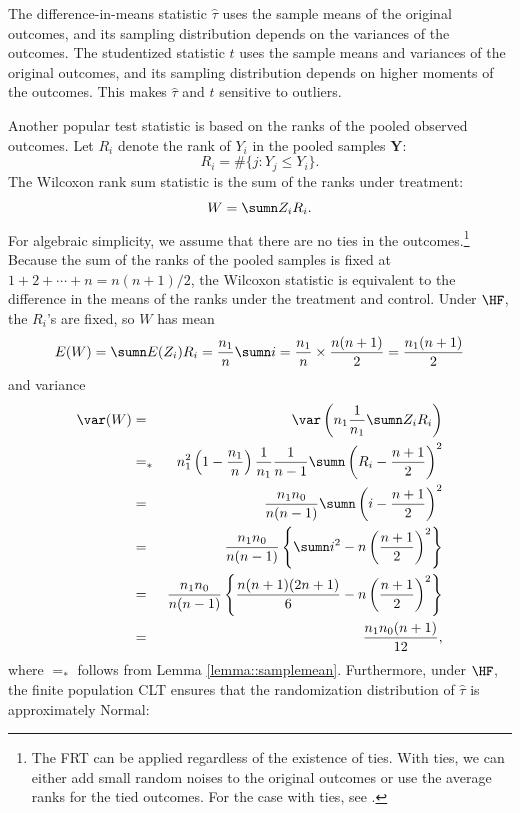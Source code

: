 \begin{example}\label{example::wilcoxon-cre}
The difference-in-means statistic $ \hat{\tau} $ uses the sample means of the original outcomes, and its sampling distribution depends on the variances of the outcomes. The studentized statistic $t$ uses the sample means and variances of the original outcomes, and its sampling distribution depends on higher moments of the outcomes. 
This makes $ \hat{\tau} $ and $t$ sensitive to outliers. 

Another popular test statistic is based on the ranks of the pooled observed outcomes. Let $R_i$ denote the rank of $Y_i$ in the pooled samples $\bm{Y}$: 
$$
R_i = \#\{j : Y_j \leq Y_i  \}.
$$ 
The Wilcoxon rank sum statistic is the sum of the ranks under treatment:
$$
W = \sumn Z_i R_i.
$$
For algebraic simplicity, we assume that there are no ties in the outcomes.\footnote{ 
The FRT can be applied regardless of the existence of ties. With ties, we can either add small random noises to the original outcomes or use the average ranks for the tied outcomes.
For the case with ties, see \citet[][Chapter 1 Section 4]{lehmann2006nonparametrics}.
}
Because the sum of the ranks of the pooled samples is fixed at $1+2+\cdots + n = n(n+1)/2$, the Wilcoxon statistic is equivalent to the difference in the means of the ranks under the treatment and control. 
Under $\HF$, the $R_i$'s are fixed, so
$W$ has mean
$$
E(W)  =  \sumn E(Z_i) R_i  =\frac{n_1}{n}  \sumn  i   = \frac{n_1}{n} \times \frac{n(n+1)}{2} = \frac{n_1(n+1)}{2} 
$$
and variance
\begin{eqnarray*}
\var(W) &=& \var\left( n_1 \frac{1}{n_1} \sumn Z_i R_i  \right) \\
&=_*&  n_1^2  \left( 1-\frac{n_1}{n} \right)  \frac{1}{n_1}  \frac{1}{n-1} \sumn \left(R_i - \frac{n+1}{2}  \right)^2\\
&=&  \frac{n_1 n_0}{n(n-1)} \sumn \left(i - \frac{n+1}{2}  \right)^2\\
&=&   \frac{n_1 n_0}{n(n-1)}   \left\{ \sumn i^2 - n \left(  \frac{n+1}{2}\right)^2     \right\}\\
&=&  \frac{n_1 n_0}{n(n-1)}  \left\{     \frac{n(n+1)(2n+1)}{6} -    n \left( \frac{n+1}{2}   \right)^2 \right\}  \\
&=& \frac{n_1 n_0 (n+1)}{12},
\end{eqnarray*}
where $=_*$ follows from Lemma \ref{lemma::samplemean}. 
Furthermore, under $\HF$, the finite population CLT ensures that the randomization distribution of $\widehat{\tau}$ is approximately Normal:

\end{example}
